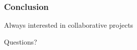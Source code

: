 \documentclass[12pt]{beamer}
\begin{document}
\begin{frame}[fragile]
\frametitle{Conclusion}


\begin{center}
\large
\vspace{-8ex}
Always interested in collaborative projects

\vspace{8ex}
Questions?
\end{center}
\end{frame}

\end{document}
